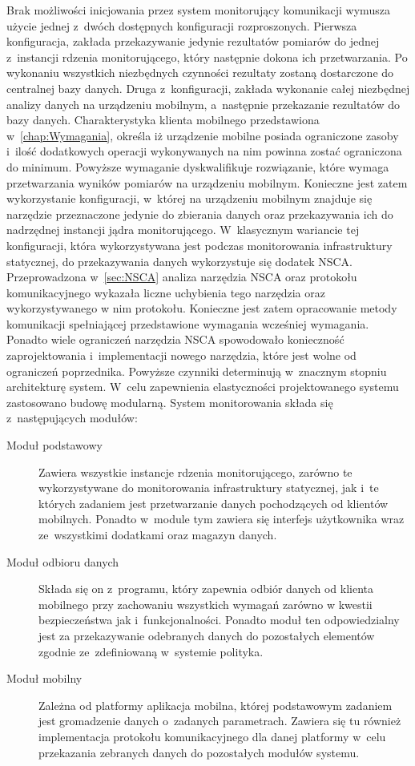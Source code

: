 Brak możliwości inicjowania przez system monitorujący komunikacji
wymusza użycie jednej z~dwóch dostępnych konfiguracji
rozproszonych. Pierwsza konfiguracja, zakłada przekazywanie jedynie
rezultatów pomiarów do jednej z~instancji rdzenia monitorującego,
który następnie dokona ich przetwarzania. Po wykonaniu wszystkich
niezbędnych czynności rezultaty zostaną dostarczone do centralnej bazy
danych. Druga z~konfiguracji, zakłada wykonanie całej niezbędnej
analizy danych na urządzeniu mobilnym, a~następnie przekazanie
rezultatów do bazy danych. Charakterystyka klienta mobilnego
przedstawiona w~\ref{chap:Wymagania}, określa iż urządzenie mobilne
posiada ograniczone zasoby i~ilość dodatkowych operacji wykonywanych
na nim powinna zostać ograniczona do minimum. Powyższe wymaganie
dyskwalifikuje rozwiązanie, które wymaga przetwarzania wyników
pomiarów na urządzeniu mobilnym. Konieczne jest zatem wykorzystanie
konfiguracji, w~której na urządzeniu mobilnym znajduje się narzędzie
przeznaczone jedynie do zbierania danych oraz przekazywania ich do
nadrzędnej instancji jądra monitorującego. W~klasycznym wariancie tej
konfiguracji, która wykorzystywana jest podczas monitorowania
infrastruktury statycznej, do przekazywania danych wykorzystuje się
dodatek NSCA. Przeprowadzona w~\ref{sec:NSCA} analiza narzędzia NSCA
oraz protokołu komunikacyjnego wykazała liczne uchybienia tego
narzędzia oraz wykorzystywanego w nim protokołu. Konieczne jest zatem
opracowanie metody komunikacji spełniającej przedstawione wymagania
wcześniej wymagania. Ponadto wiele ograniczeń narzędzia NSCA
spowodowało konieczność zaprojektowania i~implementacji nowego
narzędzia, które jest wolne od ograniczeń poprzednika. Powyższe
czynniki determinują w~znacznym stopniu architekturę system. W~celu
zapewnienia elastyczności projektowanego systemu zastosowano budowę
modularną. System monitorowania składa się z~następujących modułów:

\begin{description}
\item[Moduł podstawowy] Zawiera wszystkie instancje rdzenia
  monitorującego, zarówno te wykorzystywane do monitorowania
  infrastruktury statycznej, jak i~te których zadaniem jest
  przetwarzanie danych pochodzących od klientów mobilnych. Ponadto
  w~module tym zawiera się interfejs użytkownika wraz ze~wszystkimi
  dodatkami oraz magazyn danych.

\item[Moduł odbioru danych] Składa się on z~programu, który zapewnia
  odbiór danych od klienta mobilnego przy zachowaniu wszystkich
  wymagań zarówno w kwestii bezpieczeństwa jak
  i~funkcjonalności. Ponadto moduł ten odpowiedzialny jest za
  przekazywanie odebranych danych do pozostałych elementów zgodnie
  ze~zdefiniowaną w~systemie polityka.

\item[Moduł mobilny] Zależna od platformy aplikacja mobilna, której
  podstawowym zadaniem jest gromadzenie danych o~zadanych
  parametrach. Zawiera się tu również implementacja protokołu
  komunikacyjnego dla danej platformy w~celu przekazania zebranych
  danych do pozostałych modułów systemu.
\end{description}


